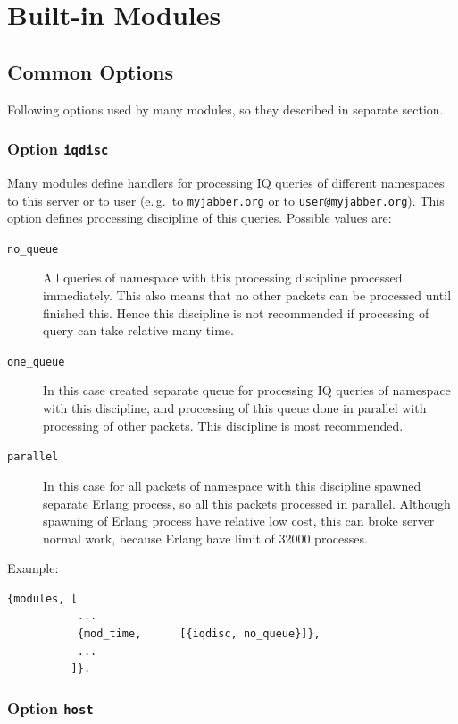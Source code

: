 \documentclass[10pt]{article}
\begin{document}
\section{Built-in Modules}
\label{sec:modules}



\subsection{Common Options}
\label{sec:modcommonopts}

Following options used by many modules, so they described in separate section.


\subsubsection{Option \texttt{iqdisc}}

Many modules define handlers for processing IQ queries of different namespaces
to this server or to user (e.\,g.\ to \texttt{myjabber.org} or to
\texttt{user@myjabber.org}).  This option defines processing discipline of this
queries.  Possible values are:
\begin{description}
\item[\texttt{no\_queue}] All queries of namespace with this processing
  discipline processed immediately.  This also means that no other packets can
  be processed until finished this.  Hence this discipline is not recommended
  if processing of query can take relative many time.
\item[\texttt{one\_queue}] In this case created separate queue for processing
  IQ queries of namespace with this discipline, and processing of this queue
  done in parallel with processing of other packets. This discipline is most
  recommended.
\item[\texttt{parallel}] In this case for all packets of namespace with this
  discipline spawned separate Erlang process, so all this packets processed in
  parallel.  Although spawning of Erlang process have relative low cost, this
  can broke server normal work, because Erlang have limit of 32000 processes.
\end{description}

Example:
\begin{verbatim}
{modules, [
           ...
           {mod_time,      [{iqdisc, no_queue}]},
           ...
          ]}.
\end{verbatim}


\subsubsection{Option \texttt{host}}
\end{document}
